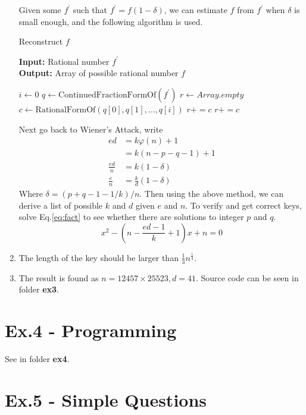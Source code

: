 \documentclass[12pt]{article}
\begin{document}
\begin{enumerate}
			Given some $f^{'}$ such that $f^{'}=f(1-\delta)$, we can estimate $f$ from $f^{'}$ when $\delta$ is small enough, and the following algorithm is used.
			\begin{algorithm}[H]
				\caption{Reconstruct $f$}
				\textbf{Input:} Rational number $f^{'}$\\
				\textbf{Output:} Array of possible rational number $f$
				\begin{algorithmic}
					\State $i \gets 0$
					\State $q \gets \text{ContinuedFractionFormOf}(f^{'})$
					\State $r \gets Array.empty$
						\State $c \gets \text{RationalFormOf}(q[0],q[1],\ldots,q[i])$
								\State $r+=c$
							\EndIf
								\State $r+=c$
							\EndIf
						\EndIf
					\EndFor
				\end{algorithmic}
			\end{algorithm}
			Next go back to Wiener's Attack, write
			\begin{align*}
				ed&=k\varphi(n)+1\\
				&=k(n-p-q-1)+1\\
				\frac{ed}{n}&=k(1-\delta)\\
				\frac{e}{n}&=\frac{k}{d}(1-\delta)
			\end{align*}
			Where $\delta=(p+q-1-1/k)/n$. Then using the above method, we can derive a list of possible $k$ and $d$ given $e$ and $n$. To verify and get correct keys, solve Eq.\ref{eq:fact} to see whether there are solutions to integer $p$ and $q$.
			\begin{equation}
				\label{eq:fact}
				x^2-(n-\frac{ed-1}{k}+1)x+n=0
			\end{equation}
		\item
			The length of the key should be larger than $\frac{1}{3}n^{\frac{1}{4}}$.
		\item
			The result is found as $n=12457\times25523,d=41$. Source code can be seen in folder \textbf{ex3}.
	\end{enumerate}

\section*{Ex.4 - Programming}

	See in folder \textbf{ex4}.

\section*{Ex.5 - Simple Questions}
\end{document}
